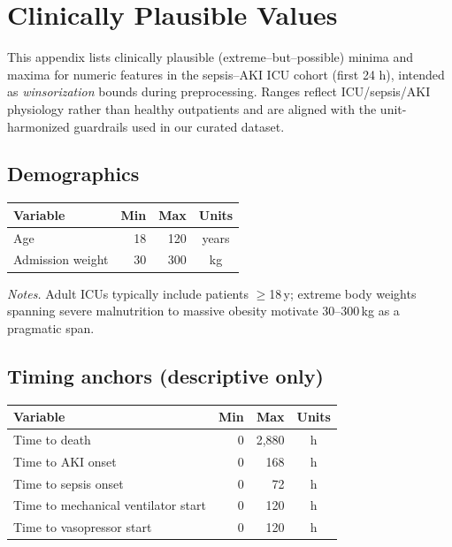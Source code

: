 \chapter{Clinically Plausible Values}
\label{app:clinical-plausible-values}

This appendix lists clinically plausible (extreme–but–possible) minima and maxima for numeric features in the sepsis–AKI ICU cohort (first 24 h), intended as \emph{winsorization} bounds during preprocessing. Ranges reflect ICU/sepsis/AKI physiology rather than healthy outpatients and are aligned with the unit-harmonized guardrails used in our curated dataset.

\vspace{0.75\baselineskip}
\section*{Demographics}
\vspace{0.75\baselineskip}
\renewcommand{\arraystretch}{1.12}
\setlength{\tabcolsep}{6pt}
\begin{table}[ht!]\centering\small
\begin{tabular}{lrrc}
\toprule
\textbf{Variable} & \textbf{Min} & \textbf{Max} & \textbf{Units} \\
\midrule
Age & 18 & 120 & years \\
Admission weight & 30 & 300 & kg \\
\bottomrule
\end{tabular}
\end{table}

\noindent\textit{Notes.} Adult ICUs typically include patients $\ge$18\,y; extreme body weights spanning severe malnutrition to massive obesity motivate 30–300\,kg as a pragmatic span.

\vspace{0.75\baselineskip}
\section*{Timing anchors (descriptive only)}
\vspace{0.75\baselineskip}
\begin{table}[ht!]\centering\small
\begin{tabular}{lrrc}
\toprule
\textbf{Variable} & \textbf{Min} & \textbf{Max} & \textbf{Units} \\
\midrule
Time to death & 0 & 2{,}880 & h \\
Time to AKI onset & 0 & 168 & h \\
Time to sepsis onset & 0 & 72 & h \\
Time to mechanical ventilator start & 0 & 120 & h \\
Time to vasopressor start & 0 & 120 & h \\
\bottomrule
\end{tabular}
\end{table}

